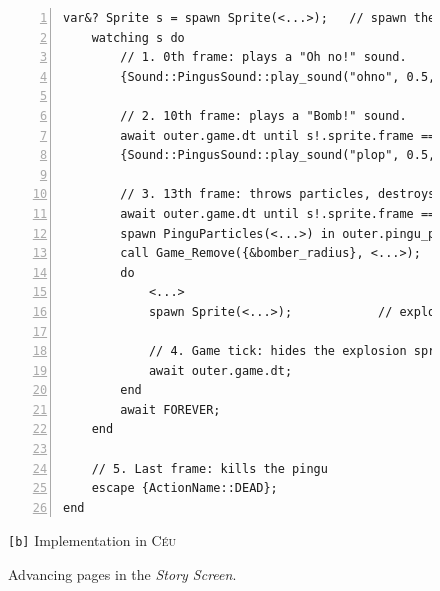 \documentclass{vgtc}                          %
\newcommand{\CEU}{\textsc{C\'{e}u}\xspace}
\newcommand{\code}[1] {{\small{\texttt{#1}}}}
\newcommand{\bx}{\code{[b]}\xspace}
\begin{document}
\begin{figure}[t]
\begin{minipage}[t]{0.45\linewidth}
\begin{lstlisting}[numbers=left,xleftmargin=3em]
    var&? Sprite s = spawn Sprite(<...>);   // spawn the bomber animation to execute in the "background"    @sprite
    watching s do                                                   @watch-1
        // 1. 0th frame: plays a "Oh no!" sound.                    @anim_1
        {Sound::PingusSound::play_sound("ohno", 0.5, 0.0)};

        // 2. 10th frame: plays a "Bomb!" sound.
        await outer.game.dt until s!.sprite.frame == 10;            @frame_1
        {Sound::PingusSound::play_sound("plop", 0.5, 0.0)};

        // 3. 13th frame: throws particles, destroys the terrain, shows an explosion sprite
        await outer.game.dt until s!.sprite.frame == 13;            @frame_2
        spawn PinguParticles(<...>) in outer.pingu_particles;       @particles
        call Game_Remove({&bomber_radius}, <...>);
        do                                                          @do
            <...>
            spawn Sprite(<...>);            // explosion            @explo

            // 4. Game tick: hides the explosion sprite
            await outer.game.dt;                                    @frame_3
        end                                                         @end
        await FOREVER;
    end                                                             @watch-2

    // 5. Last frame: kills the pingu
    escape {ActionName::DEAD};                                      @anim_2
end
\end{lstlisting}
\centering\small{\bx Implementation in \CEU}
\end{minipage}
\caption{ Advancing pages in the \emph{Story Screen}.
\label{lst.story}
}
\end{figure}
\end{document}
